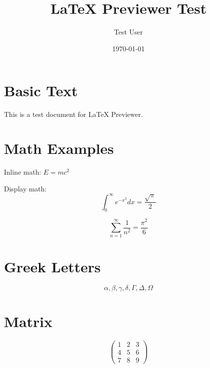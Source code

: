 \documentclass{article}
\title{LaTeX Previewer Test}
\author{Test User}
\date{\today}
\begin{document}
\maketitle

\section{Basic Text}
This is a test document for LaTeX Previewer.

\section{Math Examples}
Inline math: $E = mc^2$

Display math:
\[
\int_0^\infty e^{-x^2} dx = \frac{\sqrt{\pi}}{2}
\]

\begin{equation}
\sum_{n=1}^{\infty} \frac{1}{n^2} = \frac{\pi^2}{6}
\end{equation}

\section{Greek Letters}
\[
\alpha, \beta, \gamma, \delta, \Gamma, \Delta, \Omega
\]

\section{Matrix}
\[
\begin{pmatrix}
1 & 2 & 3 \\
4 & 5 & 6 \\
7 & 8 & 9
\end{pmatrix}
\]
\end{document}
